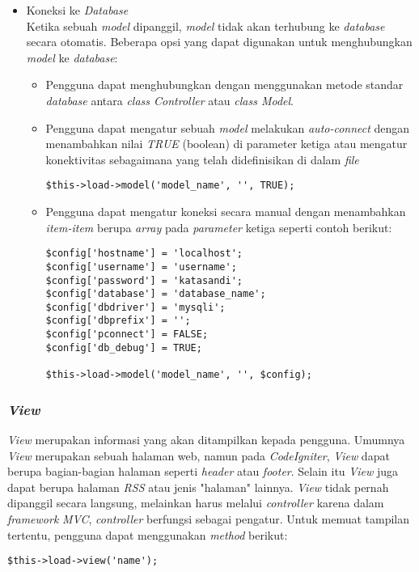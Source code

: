 \begin{itemize}
		\item Koneksi ke \textit{Database} \\
		Ketika sebuah \textit{model} dipanggil, \textit{model} tidak akan terhubung ke \textit{database} secara otomatis. Beberapa opsi yang dapat digunakan untuk menghubungkan \textit{model} ke \textit{database}:
		\begin{itemize}
			\item Pengguna dapat menghubungkan dengan menggunakan metode standar \textit{database} antara \textit{class Controller} atau \textit{class Model}. \\
			\item Pengguna dapat mengatur sebuah \textit{model} melakukan \textit{auto-connect} dengan menambahkan nilai \textit{TRUE} (boolean) di parameter ketiga atau mengatur konektivitas sebagaimana yang telah didefinisikan di dalam \textit{file} 
			\begin{lstlisting}[basicstyle=\ttfamily, frame=single,
columns=fullflexible, keepspaces=true, breaklines=true]
$this->load->model('model_name', '', TRUE);
\end{lstlisting}
			\item Pengguna dapat mengatur koneksi secara manual dengan menambahkan \textit{item-item} berupa \textit{array} pada \textit{parameter} ketiga seperti contoh berikut:
			\begin{lstlisting}[basicstyle=\ttfamily, frame=single,
columns=fullflexible, keepspaces=true, breaklines=true]
$config['hostname'] = 'localhost';
$config['username'] = 'username';
$config['password'] = 'katasandi';
$config['database'] = 'database_name';
$config['dbdriver'] = 'mysqli';
$config['dbprefix'] = '';
$config['pconnect'] = FALSE;
$config['db_debug'] = TRUE;
			
$this->load->model('model_name', '', $config);
\end{lstlisting}
		\end{itemize}
	\end{itemize}
	
	\subsubsection{\textit{View}}
	\textit{View} merupakan informasi yang akan ditampilkan kepada pengguna. Umumnya \textit{View} merupakan sebuah halaman web, namun pada \textit{CodeIgniter}, \textit{View} dapat berupa bagian-bagian halaman seperti \textit{header} atau \textit{footer}. Selain itu \textit{View} juga dapat berupa halaman \textit{RSS} atau jenis "halaman" lainnya. \textit{View} tidak pernah dipanggil secara langsung, melainkan harus melalui \textit{controller} karena dalam \textit{framework} \textit{MVC}, \textit{controller} berfungsi sebagai pengatur. Untuk memuat tampilan tertentu, pengguna dapat menggunakan \textit{method} berikut:
	\begin{lstlisting}[basicstyle=\ttfamily, frame=single,
columns=fullflexible, keepspaces=true, breaklines=true]
$this->load->view('name');
\end{lstlisting}
	

